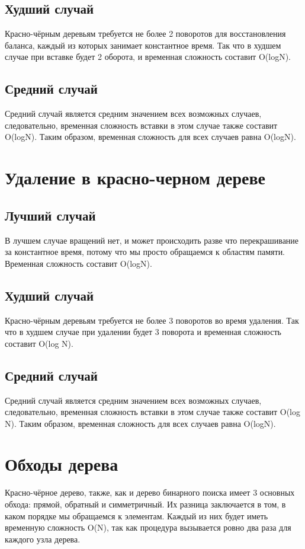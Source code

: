 \documentclass[otchet]{SCWorks}
\begin{document}
\subsection{Худший случай}
Красно-чёрным деревьям требуется не более 2 поворотов для восстановления баланса, каждый из которых занимает константное время. Так что в худшем случае при вставке будет 2 оборота, и временная сложность составит O(logN).

\subsection{Средний случай}
Средний случай является средним значением всех возможных случаев, следовательно, временная сложность вставки в этом случае также составит O(logN).
Таким образом, временная сложность для всех случаев равна O(logN).

\section{Удаление в красно-черном дереве}
\subsection{Лучший случай}
В лучшем случае вращений нет, и может происходить разве что перекрашивание за константное время, потому что мы просто обращаемся к областям памяти. Временная сложность составит O(logN).

\subsection{Худший случай}
Красно-чёрным деревьям требуется не более 3 поворотов во время удаления. Так что в худшем случае при удалении будет 3 поворота и временная сложность составит O(log N).
\subsection{Средний случай}
Средний случай является средним значением всех возможных случаев, следовательно, временная сложность вставки в этом случае также составит O(log N).
Таким образом, временная сложность для всех случаев равна O(logN).

\section{Обходы дерева}
Красно-чёрное дерево, также, как и дерево бинарного поиска имеет 3 основных обхода: прямой, обратный и симметричный. Их разница заключается в том, в каком порядке мы обращаемся к элементам. Каждый из них будет иметь временную сложность O(N), так как процедура вызывается ровно два раза для каждого узла дерева.
\end{document}

